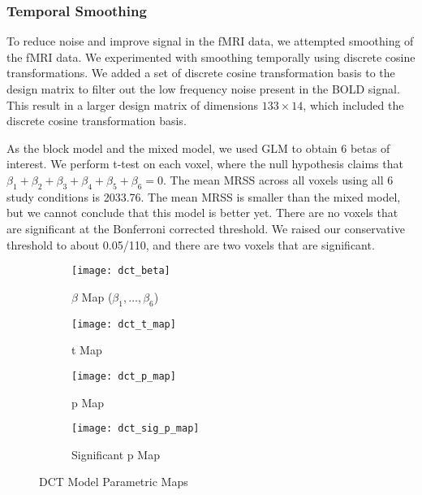 \subsubsection{Temporal Smoothing}

To reduce noise and improve signal in the fMRI data, we attempted smoothing of
the fMRI data. We experimented with smoothing temporally using discrete cosine
transformations. We added a set of discrete cosine transformation basis to the
design matrix to filter out the low frequency noise present in the BOLD signal. This 
result in a larger design matrix of dimensions $133 \times 14$, which included the 
discrete cosine transformation basis.

As the block model and the mixed model, we used GLM to obtain 6 betas of interest.
We perform t-test on each voxel, where the null hypothesis claims that  $\beta_1
+ \beta_2 + \beta_3 + \beta_4 + \beta_5 + \beta_6= 0$. The mean MRSS across all
voxels using all 6 study conditions is 2033.76. The mean MRSS is smaller than
the mixed model, but we cannot conclude that this model is better yet. There are no 
voxels that are significant at the Bonferroni corrected threshold. We raised our
conservative threshold to about 0.05/110, and there are two voxels that are
significant.

\begin{figure}[!h]
\begin{subfigure}{.5\textwidth}
  \centering
  \texttt{[image: dct\_beta]}
    \caption{$\beta$ Map ($\beta_1, \ldots, \beta_6$)}
\end{subfigure}%
\begin{subfigure}{.4\textwidth}
  \centering
  \texttt{[image: dct\_t\_map]}
  \caption{t Map}
\end{subfigure}
\begin{subfigure}{.5\textwidth}
  \centering
  \texttt{[image: dct\_p\_map]}
  \caption{p Map}
\end{subfigure}%
\begin{subfigure}{.5\textwidth}
  \centering
  \texttt{[image: dct\_sig\_p\_map]}
  \caption{Significant p Map} 
\end{subfigure}
\caption{DCT Model Parametric Maps\label{fig:dctMF}}
\end{figure}

